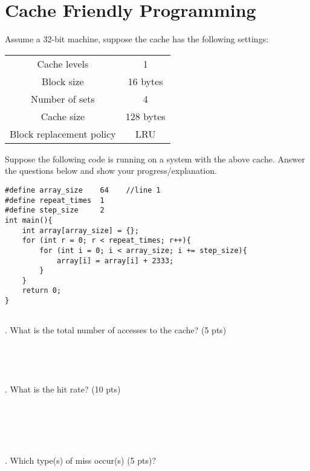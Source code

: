 \documentclass{article}
\begin{document}
\section{Cache Friendly Programming}
\noindent Assume a 32-bit machine, suppose the cache has the following settings:
\begin{table}[h!]
\centering
\setlength{\tabcolsep}{5mm}
\begin{tabular}{|c|c|}
\hline
Cache levels & 1 \\
Block size & 16 bytes \\ 
Number of sets & 4 \\
Cache size & 128 bytes  \\
Block replacement policy & LRU  \\ \hline
\end{tabular}
\end{table}

\noindent Suppose the following code is running on a system with the above cache. {\color{red} Answer the questions below and show your progress/explanation}.
\begin{verbatim}
#define array_size    64    //line 1
#define repeat_times  1
#define step_size     2
int main(){
    int array[array_size] = {};
    for (int r = 0; r < repeat_times; r++){
        for (int i = 0; i < array_size; i += step_size){
            array[i] = array[i] + 2333;
        }
    }
    return 0;
}
  
  \end{verbatim}

. What is the total number of accesses to the cache?{\color{red} (5 pts)}
~\\
~\\
~\\
~\\
~\\
. What is the hit rate?{\color{red} (10 pts)}
~\\
~\\
~\\
~\\
~\\
~\\
. Which type(s) of miss occur(s){\color{red} (5 pts)}?
\end{document}
